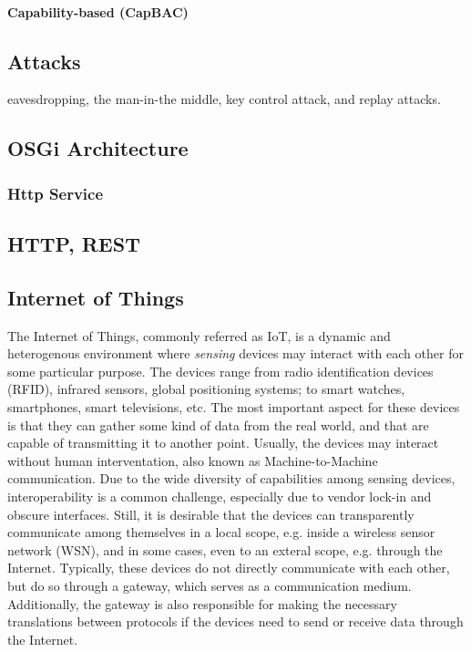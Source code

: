 \documentclass[12pt]{article}
\begin{document}
\paragraph{Capability-based (CapBAC)}

\subsection{Attacks}

eavesdropping, the man-in-the middle, key control attack, and replay attacks.

\subsection{OSGi Architecture}

\subsubsection{Http Service}

\subsection{HTTP, REST}

\subsection{Internet of Things} 

The Internet of Things, commonly referred as IoT, is a dynamic and heterogenous environment where \emph{sensing} devices may interact with each other for some particular purpose. The devices range from radio identification devices (RFID), infrared sensors, global positioning systems; to smart watches, smartphones, smart televisions, etc. The most important aspect for these devices is that they can gather some kind of data from the real world, and that are capable of transmitting it to another point. Usually, the devices may interact without human interventation, also known as Machine-to-Machine communication. Due to the wide diversity of capabilities among sensing devices, interoperability is a common challenge, especially due to vendor lock-in and obscure interfaces. Still, it is desirable that the devices can transparently communicate among themselves in a local scope, e.g. inside a wireless sensor network (WSN), and in some cases, even to an exteral scope, e.g. through the Internet. Typically, these devices do not directly communicate with each other, but do so through a gateway, which serves as a communication medium. Additionally, the gateway is also responsible for making the necessary translations between protocols if the devices need to send or receive data through the Internet.
\end{document}

